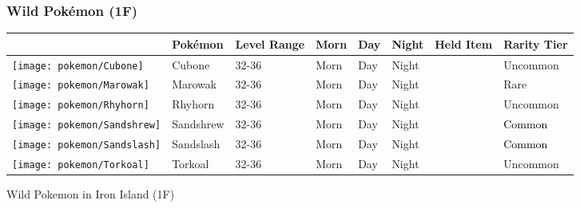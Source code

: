 \subsubsection{Wild Pokémon (1F)}%
\label{ssubsec:WildPokmon(1F)}%
\begin{longtable}{||l l l l l l l l||}%
\hline%
\rowcolor{gray}%
&Pokémon&Level Range&Morn&Day&Night&Held Item&Rarity Tier\\%
\hline%
\endhead%
\hline%
\rowcolor{gray}%
\texttt{[image: pokemon/Cubone]}&Cubone&32{-}36&Morn&Day&Night&&\textcolor{OliveGreen}{%
Uncommon%
}\\%
\hline%
\rowcolor{gray}%
\texttt{[image: pokemon/Marowak]}&Marowak&32{-}36&Morn&Day&Night&&\textcolor{RedOrange}{%
Rare%
}\\%
\hline%
\rowcolor{gray}%
\texttt{[image: pokemon/Rhyhorn]}&Rhyhorn&32{-}36&Morn&Day&Night&&\textcolor{OliveGreen}{%
Uncommon%
}\\%
\hline%
\rowcolor{gray}%
\texttt{[image: pokemon/Sandshrew]}&Sandshrew&32{-}36&Morn&Day&Night&&\textcolor{black}{%
Common%
}\\%
\hline%
\rowcolor{gray}%
\texttt{[image: pokemon/Sandslash]}&Sandslash&32{-}36&Morn&Day&Night&&\textcolor{black}{%
Common%
}\\%
\hline%
\rowcolor{gray}%
\texttt{[image: pokemon/Torkoal]}&Torkoal&32{-}36&Morn&Day&Night&&\textcolor{OliveGreen}{%
Uncommon%
}\\%
\hline%
\end{longtable}%
\caption{Wild Pokemon in Iron Island (1F)}